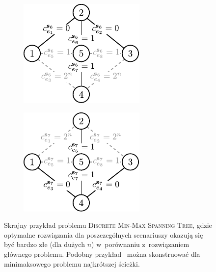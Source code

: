 \begin{figure}[!htbp]
	\null\hfill
	\begin{subfigure}[b]{0.3\textwidth}
		\includegraphics[width=\textwidth]{Chapter_II/MIN-MAX-DESC3-example/a}
		\caption{}
		\label{fig:minmaxexample2:a}
	\end{subfigure}
	\hfill
	\begin{subfigure}[b]{0.3\textwidth}
		\includegraphics[width=\textwidth]{Chapter_II/MIN-MAX-DESC3-example/b}
		\caption{}
		\label{fig:minmaxexample2:b}
	\end{subfigure}
	\hfill\null
	\caption{
		Skrajny przykład problemu \textsc{Discrete Min-Max Spanning Tree}, gdzie optymalne rozwiązania dla poszczególnych scenariuszy okazują się być bardzo złe (dla dużych $n$) w~porównaniu z~rozwiązaniem głównego problemu.
		Podobny przykład~\cite[$429$--$430$]{minmaxSurvey} można skonstruować dla minimaksowego problemu najkrótszej ścieżki.
	}
	\label{fig:minmaxexample2}
\end{figure}


